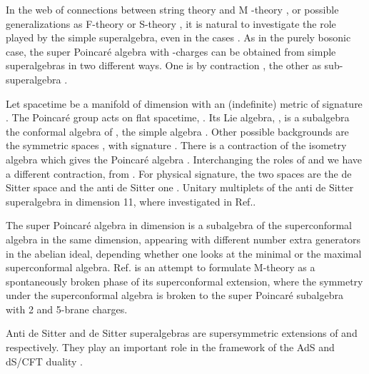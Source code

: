 \documentclass[a4paper,12pt]{article}
\begin{document}
 In the web of connections between
string theory and M -theory \cite{wi}, or possible generalizations
as F-theory \cite{va} or S-theory \cite{ba}, it is natural to
investigate the role played by the simple superalgebra,  even in
the cases \coordHE{} \cite{dflv,dfl,to,to2,ho,bvp}. As in the purely
bosonic case, the super Poincar\'e algebra with \coordHE{}-charges can be
obtained from simple superalgebras in two different ways. One is
by contraction \cite{df}, the other as sub-superalgebra
\cite{to,to2}.


Let spacetime be  a manifold of dimension \coordHE{} with an (indefinite)
metric of signature \coordHE{}. The Poincar\'e group acts on flat
spacetime, \coordHE{}. Its
Lie algebra, \coordHE{}, is a subalgebra the conformal algebra
of \coordHE{}, the simple algebra \coordHE{} \cite{affs}. Other
possible backgrounds are the symmetric spaces \coordHE{}, with signature \coordHE{}. There is a
contraction of the isometry algebra \coordHE{} which gives the
Poincar\'e algebra \coordHE{}. Interchanging the roles of \coordHE{}
and \coordHE{} we have a different contraction, from \coordHE{}. For
physical signature, the two spaces are  the de Sitter space \coordHE{} and the anti de Sitter one \coordHE{}. Unitary multiplets of the anti de
Sitter superalgebra in dimension 11, \coordHE{} where
investigated in Ref.\cite{gu}.

 The super
Poincar\'e algebra in dimension \coordHE{} is a subalgebra of the
superconformal algebra in the same dimension, appearing with
different number extra generators in the abelian ideal, depending
whether one looks at the minimal or the maximal superconformal
algebra. Ref.\cite{we}
 is an attempt to formulate M-theory as a spontaneously
broken phase of its superconformal extension, where the symmetry
under the  superconformal algebra \coordHE{} is broken to the
super Poincar\'e subalgebra with 2 and 5-brane charges.

Anti de Sitter and de Sitter superalgebras are  supersymmetric
extensions of \coordHE{} and  \coordHE{} respectively. They
play an important role in the framework of the AdS and dS/CFT
duality \cite{agmoo,wi2,str,hu2}.
\end{document}
